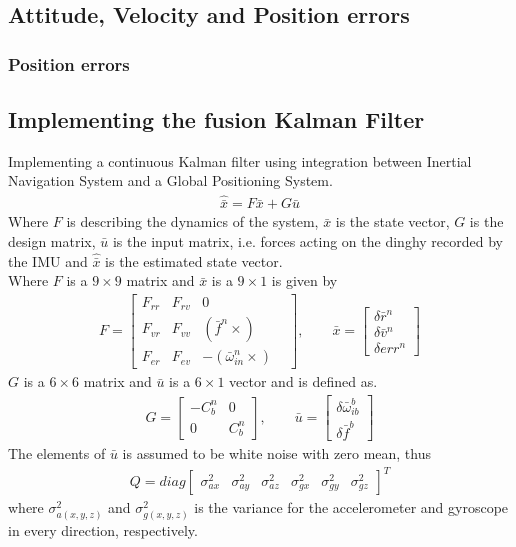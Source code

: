 \subsection*{Attitude, Velocity and Position errors}
\subsubsection*{Position errors}


\subsection*{Implementing the fusion Kalman Filter}
Implementing a continuous Kalman filter using integration between Inertial Navigation System and a Global Positioning System.
\begin{align}
\hat{\bar{x}} = F \bar{x} + G \bar{u}
\label{eq.state_1}
\end{align}
Where $F$ is describing the dynamics of the system, $\bar{x}$ is the state vector, $G$ is the design matrix, $\bar{u}$ is the input matrix, i.e. forces acting on the dinghy recorded by the IMU and $\hat{\bar{x}}$ is the estimated state vector. \\

Where $F$ is a $9\times 9$ matrix and $\bar{x}$ is a $9 \times 1$ is given by
\begin{align}
F=
\begin{bmatrix}
F_{rr} & F_{rv} & 0 &\\
F_{vr} & F_{vv} & (\bar{f}^n \times)\\
F_{er} & F_{ev} & -(\bar{\omega}_{in}^n\times)
\end{bmatrix},
\qquad
\bar{x}=
\begin{bmatrix}
\delta\bar{r}^n \\
\delta\bar{v}^n\\
\delta err^n
\end{bmatrix}
\end{align}
$G$ is a $6\times6$ matrix and $\bar{u}$ is a $6 \times 1$ vector and is defined as.
\begin{align}
G=
\begin{bmatrix}
-C_b^n & 0 \\
0 & C_b^n
\end{bmatrix},
\qquad
\bar{u}=
\begin{bmatrix}
\delta \bar{\omega}_{ib}^b \\
\delta \bar{f}^b 
\end{bmatrix}
\end{align}
The elements of $\bar{u}$ is assumed to be white noise with zero mean, thus
\begin{align}
Q=diag
\begin{bmatrix}
\sigma^2_{ax} & \sigma^2_{ay} & \sigma^2_{az} & \sigma^2_{gx} & \sigma^2_{gy} & \sigma^2_{gz}
\end{bmatrix}^T
\label{Eq.Q}
\end{align}
where $\sigma^2_{a(x,y,z)}$ and $\sigma^2_{g(x,y,z)}$ is the variance for the accelerometer and gyroscope in every direction, respectively.\\

